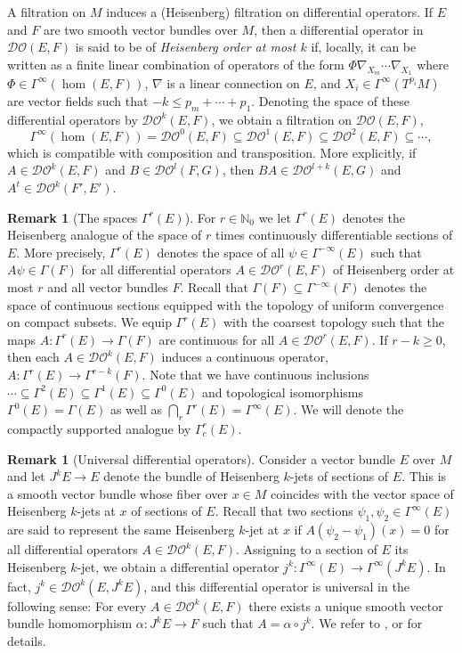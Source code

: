 \documentclass[reqno,12pt]{amsart}
\newcommand{\DO}{\mathcal D\mathcal O}
\theoremstyle{plain}
\theoremstyle{definition}
\newtheorem{remark}[theorem]{Remark}
\begin{document}
A filtration on $M$ induces a (Heisenberg) filtration on differential operators.
If $E$ and $F$ are two smooth vector bundles over $M$, then a differential operator in $\DO(E,F)$ is said to be of \emph{Heisenberg order at most $k$} if, locally, it can be written as a finite linear combination of operators of the form $\Phi\nabla_{X_m}\cdots\nabla_{X_1}$ where $\Phi\in\Gamma^\infty(\hom(E,F))$, $\nabla$ is a linear connection on $E$, and $X_i\in\Gamma^\infty(T^{p_i}M)$ are vector fields such that $-k\leq p_m+\cdots+p_1$.
Denoting the space of these differential operators by $\DO^k(E,F)$, we obtain a filtration on $\DO(E,F)$,
$$
\Gamma^\infty(\hom(E,F))=\DO^0(E,F)\subseteq\DO^1(E,F)\subseteq\DO^2(E,F)\subseteq\cdots,
$$
which is compatible with composition and transposition.
More explicitly, if $A\in\DO^k(E,F)$ and $B\in\DO^l(F,G)$, then $BA\in\DO^{l+k}(E,G)$ and $A^t\in\DO^k(F',E')$.


\begin{remark}[The spaces $\Gamma^r(E)$]\label{R:GammarE}
For $r\in\mathbb N_0$ we let $\Gamma^r(E)$ denotes the Heisenberg analogue of the space of $r$ times continuously differentiable sections of $E$.
More precisely, $\Gamma^r(E)$ denotes the space of all $\psi\in\Gamma^{-\infty}(E)$ such that $A\psi\in\Gamma(F)$ for all differential operators $A\in\DO^r(E,F)$ of Heisenberg order at most $r$ and all vector bundles $F$.
Recall that $\Gamma(F)\subseteq\Gamma^{-\infty}(F)$ denotes the space of continuous sections equipped with the topology of uniform convergence on compact subsets.
We equip $\Gamma^r(E)$ with the coarsest topology such that the maps $A\colon\Gamma^r(E)\to\Gamma(F)$ are continuous for all $A\in\DO^r(E,F)$.
If $r-k\geq0$, then each $A\in\DO^k(E,F)$ induces a continuous operator, $A\colon\Gamma^r(E)\to\Gamma^{r-k}(F)$.
Note that we have continuous inclusions $\cdots\subseteq\Gamma^2(E)\subseteq\Gamma^1(E)\subseteq\Gamma^0(E)$ and topological isomorphisms $\Gamma^0(E)=\Gamma(E)$ as well as $\bigcap_r\Gamma^r(E)=\Gamma^\infty(E)$.
We will denote the compactly supported analogue by $\Gamma^r_c(E)$.
\end{remark}


\begin{remark}[Universal differential operators]\label{R:jk}
Consider a vector bundle $E$ over $M$ and let $J^kE\to E$ denote the bundle of Heisenberg $k$-jets of sections of $E$.
This is a smooth vector bundle whose fiber over $x\in M$ coincides with the vector space of Heisenberg $k$-jets at $x$ of sections of $E$.
Recall that two sections $\psi_1,\psi_2\in\Gamma^\infty(E)$ are said to represent the same Heisenberg $k$-jet at $x$ if $A(\psi_2-\psi_1)(x)=0$ for all differential operators $A\in\DO^k(E,F)$.
Assigning to a section of $E$ its Heisenberg $k$-jet, we obtain a differential operator $j^k\colon\Gamma^\infty(E)\to\Gamma^\infty(J^kE)$.
In fact, $j^k\in\DO^k(E,J^kE)$, and this differential operator is universal in the following sense: For every $A\in\DO^k(E,F)$ there exists a unique smooth vector bundle homomorphism $\alpha\colon J^kE\to F$ such that $A=\alpha\circ j^k$.
We refer to \cite[Section~3.1]{M02}, \cite[Section~1.2.6]{N10} or \cite{N09} for details.
\end{remark}
\end{document}
